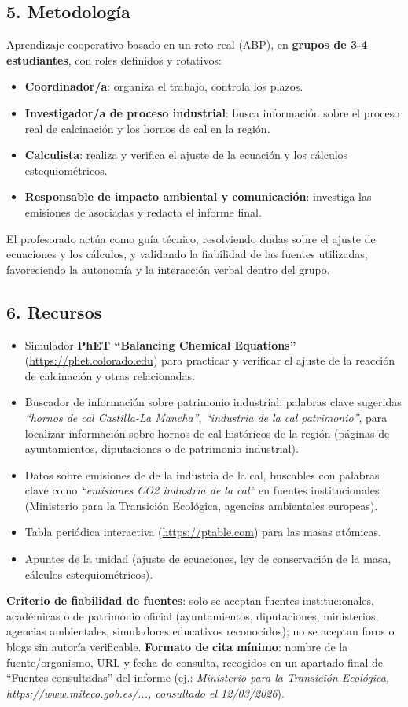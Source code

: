 \documentclass[11pt,a4paper]{article}
\begin{document}
\subsection*{5. Metodología}
Aprendizaje cooperativo basado en un reto real (ABP), en \textbf{grupos de 3-4 estudiantes}, con roles definidos y rotativos:
\begin{itemize}
    \item \textbf{Coordinador/a}: organiza el trabajo, controla los plazos.
    \item \textbf{Investigador/a de proceso industrial}: busca información sobre el proceso real de calcinación y los hornos de cal en la región.
    \item \textbf{Calculista}: realiza y verifica el ajuste de la ecuación y los cálculos estequiométricos.
    \item \textbf{Responsable de impacto ambiental y comunicación}: investiga las emisiones de  asociadas y redacta el informe final.
\end{itemize}
El profesorado actúa como guía técnico, resolviendo dudas sobre el ajuste de ecuaciones y los cálculos, y validando la fiabilidad de las fuentes utilizadas, favoreciendo la autonomía y la interacción verbal dentro del grupo.

\subsection*{6. Recursos}
\begin{itemize}
    \item Simulador \textbf{PhET ``Balancing Chemical Equations''} (\url{https://phet.colorado.edu}) para practicar y verificar el ajuste de la reacción de calcinación y otras relacionadas.
    \item Buscador de información sobre patrimonio industrial: palabras clave sugeridas \textit{``hornos de cal Castilla-La Mancha''}, \textit{``industria de la cal patrimonio''}, para localizar información sobre hornos de cal históricos de la región (páginas de ayuntamientos, diputaciones o de patrimonio industrial).
    \item Datos sobre emisiones de  de la industria de la cal, buscables con palabras clave como \textit{``emisiones CO2 industria de la cal''} en fuentes institucionales (Ministerio para la Transición Ecológica, agencias ambientales europeas).
    \item Tabla periódica interactiva (\url{https://ptable.com}) para las masas atómicas.
    \item Apuntes de la unidad (ajuste de ecuaciones, ley de conservación de la masa, cálculos estequiométricos).
\end{itemize}
\textbf{Criterio de fiabilidad de fuentes}: solo se aceptan fuentes institucionales, académicas o de patrimonio oficial (ayuntamientos, diputaciones, ministerios, agencias ambientales, simuladores educativos reconocidos); no se aceptan foros o blogs sin autoría verificable. \textbf{Formato de cita mínimo}: nombre de la fuente/organismo, URL y fecha de consulta, recogidos en un apartado final de ``Fuentes consultadas'' del informe (ej.: \textit{Ministerio para la Transición Ecológica, https://www.miteco.gob.es/..., consultado el 12/03/2026}).
\end{document}
